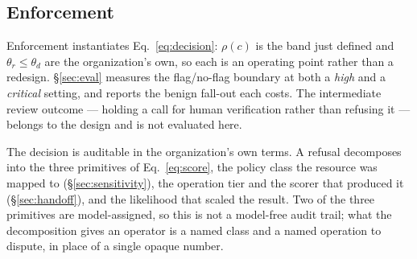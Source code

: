 \subsection{Enforcement}
\label{sec:enforcement}

Enforcement instantiates Eq.~\ref{eq:decision}: $\rho(c)$ is the band just
defined and $\theta_{r} \le \theta_{d}$ are the organization's own, so each is
an operating point rather than a redesign. \S\ref{sec:eval} measures the
flag/no-flag boundary at both a \emph{high} and a \emph{critical} setting, and
reports the benign fall-out each costs. The intermediate \textsf{review}
outcome --- holding a call for human verification rather than refusing it ---
belongs to the design and is not evaluated here.

The decision is auditable in the organization's own terms. A refusal decomposes
into the three primitives of Eq.~\ref{eq:score}, the policy class the resource
was mapped to (\S\ref{sec:sensitivity}), the operation tier and the scorer that
produced it (\S\ref{sec:handoff}), and the likelihood that scaled the result.
Two of the three primitives are model-assigned, so this is not a model-free
audit trail; what the decomposition gives an operator is a named class and a
named operation to dispute, in place of a single opaque number.

